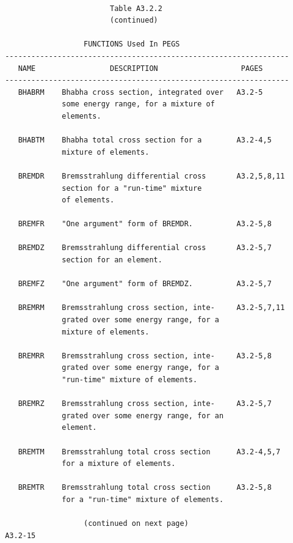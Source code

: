 \newpage  {}\begin{verbatim}

                         Table A3.2.2
                         (continued)

                   FUNCTIONS Used In PEGS
 -----------------------------------------------------------------
    NAME                 DESCRIPTION                   PAGES
 -----------------------------------------------------------------
    BHABRM    Bhabha cross section, integrated over   A3.2-5
              some energy range, for a mixture of
              elements.

    BHABTM    Bhabha total cross section for a        A3.2-4,5
              mixture of elements.

    BREMDR    Bremsstrahlung differential cross       A3.2,5,8,11
              section for a "run-time" mixture
              of elements.

    BREMFR    "One argument" form of BREMDR.          A3.2-5,8

    BREMDZ    Bremsstrahlung differential cross       A3.2-5,7
              section for an element.

    BREMFZ    "One argument" form of BREMDZ.          A3.2-5,7

    BREMRM    Bremsstrahlung cross section, inte-     A3.2-5,7,11
              grated over some energy range, for a
              mixture of elements.

    BREMRR    Bremsstrahlung cross section, inte-     A3.2-5,8
              grated over some energy range, for a
              "run-time" mixture of elements.

    BREMRZ    Bremsstrahlung cross section, inte-     A3.2-5,7
              grated over some energy range, for an
              element.

    BREMTM    Bremsstrahlung total cross section      A3.2-4,5,7
              for a mixture of elements.

    BREMTR    Bremsstrahlung total cross section      A3.2-5,8
              for a "run-time" mixture of elements.

                   (continued on next page)
 A3.2-15
\end{verbatim}
